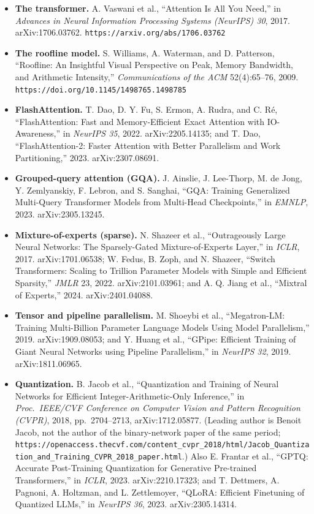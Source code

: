 \begin{itemize}\tightlist
\item \textbf{The transformer.} A. Vaswani et al., ``Attention Is All You Need,'' in \emph{Advances in Neural Information Processing Systems (NeurIPS) 30}, 2017. arXiv:1706.03762. \texttt{https://arxiv.org/abs/1706.03762}
\item \textbf{The roofline model.} S. Williams, A. Waterman, and D. Patterson, ``Roofline: An Insightful Visual Perspective on Peak, Memory Bandwidth, and Arithmetic Intensity,'' \emph{Communications of the ACM} 52(4):65--76, 2009. \texttt{https://doi.org/10.1145/1498765.1498785}
\item \textbf{FlashAttention.} T. Dao, D. Y. Fu, S. Ermon, A. Rudra, and C. R\'e, ``FlashAttention: Fast and Memory-Efficient Exact Attention with IO-Awareness,'' in \emph{NeurIPS 35}, 2022. arXiv:2205.14135; and T. Dao, ``FlashAttention-2: Faster Attention with Better Parallelism and Work Partitioning,'' 2023. arXiv:2307.08691.
\item \textbf{Grouped-query attention (GQA).} J. Ainslie, J. Lee-Thorp, M. de Jong, Y. Zemlyanskiy, F. Lebron, and S. Sanghai, ``GQA: Training Generalized Multi-Query Transformer Models from Multi-Head Checkpoints,'' in \emph{EMNLP}, 2023. arXiv:2305.13245.
\item \textbf{Mixture-of-experts (sparse).} N. Shazeer et al., ``Outrageously Large Neural Networks: The Sparsely-Gated Mixture-of-Experts Layer,'' in \emph{ICLR}, 2017. arXiv:1701.06538; W. Fedus, B. Zoph, and N. Shazeer, ``Switch Transformers: Scaling to Trillion Parameter Models with Simple and Efficient Sparsity,'' \emph{JMLR} 23, 2022. arXiv:2101.03961; and A. Q. Jiang et al., ``Mixtral of Experts,'' 2024. arXiv:2401.04088.
\item \textbf{Tensor and pipeline parallelism.} M. Shoeybi et al., ``Megatron-LM: Training Multi-Billion Parameter Language Models Using Model Parallelism,'' 2019. arXiv:1909.08053; and Y. Huang et al., ``GPipe: Efficient Training of Giant Neural Networks using Pipeline Parallelism,'' in \emph{NeurIPS 32}, 2019. arXiv:1811.06965.
\item \textbf{Quantization.} B. Jacob et al., ``Quantization and Training of Neural Networks for Efficient Integer-Arithmetic-Only Inference,'' in \emph{Proc.\ IEEE/CVF Conference on Computer Vision and Pattern Recognition (CVPR)}, 2018, pp.~2704--2713, arXiv:1712.05877. (Leading author is Benoit Jacob, not the author of the binary-network paper of the same period; \texttt{https://openaccess.thecvf.com/content\_cvpr\_2018/html/Jacob\_Quantization\_and\_Training\_CVPR\_2018\_paper.html}.) Also E. Frantar et al., ``GPTQ: Accurate Post-Training Quantization for Generative Pre-trained Transformers,'' in \emph{ICLR}, 2023. arXiv:2210.17323; and T. Dettmers, A. Pagnoni, A. Holtzman, and L. Zettlemoyer, ``QLoRA: Efficient Finetuning of Quantized LLMs,'' in \emph{NeurIPS 36}, 2023. arXiv:2305.14314.

\end{itemize}

